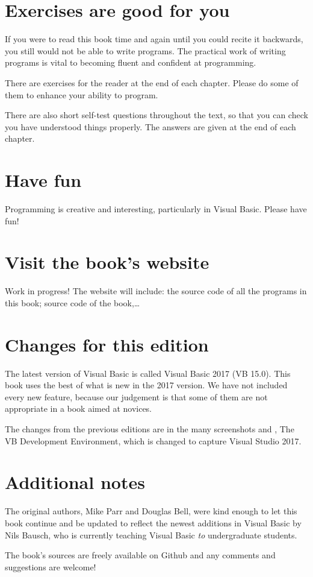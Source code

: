 	\section*{Exercises are good for you}
		If you were to read this book time and again until you could recite it backwards, you still would not be able to write programs. The practical work of writing programs is vital to becoming fluent and confident at programming.

		There are exercises for the reader at the end of each chapter. Please do some of them to enhance your ability to program.

		There are also short self-test questions throughout the text, so that you can check you have understood things properly. The answers are given at the end of each chapter.

	\section*{Have fun}
		Programming is creative and interesting, particularly in Visual Basic. Please have fun!

	\section*{Visit the book's website}
		Work in progress! 	The website will include: the source code of all the programs in this book; source code of the book,…

	\section*{Changes for this edition}
		The latest version of Visual Basic is called Visual Basic 2017 (VB 15.0). This book uses the best of what is new in the 2017 version. We have not included every new feature, because our judgement is that some of them are not appropriate in a book aimed at novices.

		The changes from the previous editions are in the many screenshots and , The VB Development Environment, which is changed to capture Visual Studio 2017.

	\section*{Additional notes}
		The original authors, Mike Parr and Douglas Bell, were kind enough to let this book continue and be updated to reflect the newest additions in Visual Basic by Nils Bausch, who is currently teaching Visual Basic \emph{to} undergraduate students.

		The book's sources are freely available on Github and any comments and suggestions are welcome!



